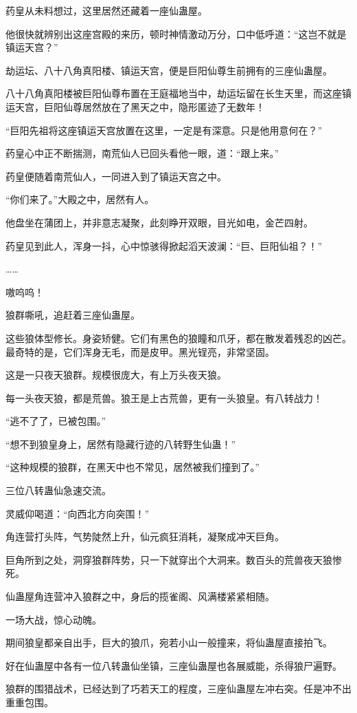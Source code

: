 \begin{this_body}
药皇从未料想过，这里居然还藏着一座仙蛊屋。

他很快就辨别出这座宫殿的来历，顿时神情激动万分，口中低呼道：“这岂不就是镇运天宫？”

劫运坛、八十八角真阳楼、镇运天宫，便是巨阳仙尊生前拥有的三座仙蛊屋。

八十八角真阳楼被巨阳仙尊布置在王庭福地当中，劫运坛留在长生天里，而这座镇运天宫，巨阳仙尊居然放在了黑天之中，隐形匿迹了无数年！

“巨阳先祖将这座镇运天宫放置在这里，一定是有深意。只是他用意何在？”

药皇心中正不断揣测，南荒仙人已回头看他一眼，道：“跟上来。”

药皇便随着南荒仙人，一同进入到了镇运天宫之中。

“你们来了。”大殿之中，居然有人。

他盘坐在蒲团上，并非意志凝聚，此刻睁开双眼，目光如电，金芒四射。

药皇见到此人，浑身一抖，心中惊骇得掀起滔天波澜：“巨、巨阳仙祖？！”

……

嗷呜呜！

狼群嘶吼，追赶着三座仙蛊屋。

这些狼体型修长。身姿矫健。它们有黑色的狼瞳和爪牙，都在散发着残忍的凶芒。最奇特的是，它们浑身无毛，而是皮甲。黑光锃亮，非常坚固。

这是一只夜天狼群。规模很庞大，有上万头夜天狼。

每一头夜天狼，都是荒兽。狼王是上古荒兽，更有一头狼皇。有八转战力！

“逃不了了，已被包围。”

“想不到狼皇身上，居然有隐藏行迹的八转野生仙蛊！”

“这种规模的狼群，在黑天中也不常见，居然被我们撞到了。”

三位八转蛊仙急速交流。

灵威仰喝道：“向西北方向突围！”

角连营打头阵，气势陡然上升，仙元疯狂消耗，凝聚成冲天巨角。

巨角所到之处，洞穿狼群阵势，只一下就穿出个大洞来。数百头的荒兽夜天狼惨死。

仙蛊屋角连营冲入狼群之中，身后的揽雀阁、风满楼紧紧相随。

一场大战，惊心动魄。

期间狼皇都亲自出手，巨大的狼爪，宛若小山一般撞来，将仙蛊屋直接拍飞。

好在仙蛊屋中各有一位八转蛊仙坐镇，三座仙蛊屋也各展威能，杀得狼尸遍野。

狼群的围猎战术，已经达到了巧若天工的程度，三座仙蛊屋左冲右突。任是冲不出重重包围。


\end{this_body}

